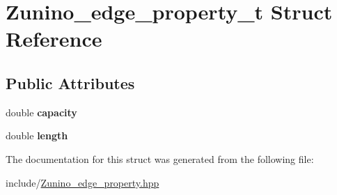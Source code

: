 \hypertarget{structZunino__edge__property__t}{
\section{Zunino\_\-edge\_\-property\_\-t Struct Reference}
\label{structZunino__edge__property__t}
}
\subsection*{Public Attributes}
\begin{DoxyCompactItemize}
\item 
\hypertarget{structZunino__edge__property__t_adb224930eb2b0572fc47f01e96ce0d3f}{
double {\bfseries capacity}}
\label{structZunino__edge__property__t_adb224930eb2b0572fc47f01e96ce0d3f}

\item 
\hypertarget{structZunino__edge__property__t_a8277c98a24dd9a88a7947154b89c9b86}{
double {\bfseries length}}
\label{structZunino__edge__property__t_a8277c98a24dd9a88a7947154b89c9b86}

\end{DoxyCompactItemize}


The documentation for this struct was generated from the following file:\begin{DoxyCompactItemize}
\item 
include/\hyperlink{Zunino__edge__property_8hpp}{Zunino\_\-edge\_\-property.hpp}\end{DoxyCompactItemize}
